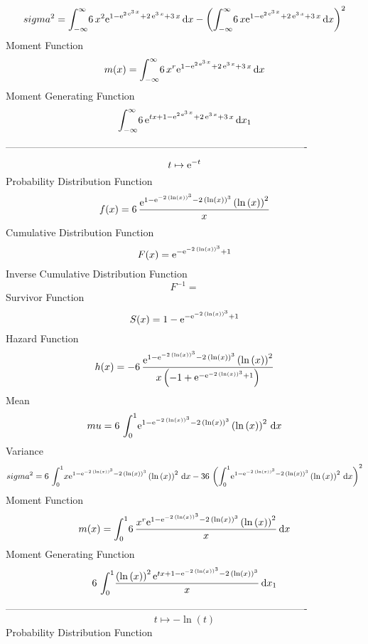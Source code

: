 \documentclass[12pt]{article}
\begin{document}
 $$ sigma^2 = \int_{-\infty }^{\infty }\!6\,{x}^{2}{{\rm e}^{1-{{\rm e}^{2\,{{\rm e}
^{3\,x}}}}+2\,{{\rm e}^{3\,x}}+3\,x}}\,{\rm d}x- \left( \int_{-\infty 
}^{\infty }\!6\,x{{\rm e}^{1-{{\rm e}^{2\,{{\rm e}^{3\,x}}}}+2\,{
{\rm e}^{3\,x}}+3\,x}}\,{\rm d}x \right) ^{2}
$$Moment Function 
 $$ m(x) = \int_{-\infty }^{\infty }\!6\,{x}^{r}{{\rm e}^{1-{{\rm e}^{2\,{{\rm e}
^{3\,x}}}}+2\,{{\rm e}^{3\,x}}+3\,x}}\,{\rm d}x
$$ Moment Generating Function 
 $$\int_{-\infty }^{\infty }\!6\,{{\rm e}^{tx+1-{{\rm e}^{2\,{{\rm e}^{3
\,x}}}}+2\,{{\rm e}^{3\,x}}+3\,x}}\,{\rm d}x_{{1}}
$$-------------------------------------------------------------------------------------------  \\$$t\mapsto {{\rm e}^{-t}}
$$Probability Distribution Function 
$$  f(x)=6\,{\frac {{{\rm e}^{1-{{\rm e}^{-2\, \left( \ln  \left( x \right) 
 \right) ^{3}}}-2\, \left( \ln  \left( x \right)  \right) ^{3}}}
 \left( \ln  \left( x \right)  \right) ^{2}}{x}}
$$Cumulative Distribution Function  
 $$F(x)={{\rm e}^{-{{\rm e}^{-2\, \left( \ln  \left( x \right)  \right) ^{3}}}
+1}}
$$ Inverse Cumulative Distribution Function 
  $$F^{-1} = 
$$Survivor Function 
 $$ S(x)=1-{{\rm e}^{-{{\rm e}^{-2\, \left( \ln  \left( x \right)  \right) ^{3}
}}+1}}
$$ Hazard Function 
 $$ h(x)=-6\,{\frac {{{\rm e}^{1-{{\rm e}^{-2\, \left( \ln  \left( x \right) 
 \right) ^{3}}}-2\, \left( \ln  \left( x \right)  \right) ^{3}}}
 \left( \ln  \left( x \right)  \right) ^{2}}{x \left( -1+{{\rm e}^{-{
{\rm e}^{-2\, \left( \ln  \left( x \right)  \right) ^{3}}}+1}}
 \right) }}
$$Mean 
 $$ mu=6\,\int_{0}^{1}\!{{\rm e}^{1-{{\rm e}^{-2\, \left( \ln  \left( x
 \right)  \right) ^{3}}}-2\, \left( \ln  \left( x \right)  \right) ^{3
}}} \left( \ln  \left( x \right)  \right) ^{2}\,{\rm d}x
$$ Variance 
 $$ sigma^2 = 6\,\int_{0}^{1}\!x{{\rm e}^{1-{{\rm e}^{-2\, \left( \ln  \left( x
 \right)  \right) ^{3}}}-2\, \left( \ln  \left( x \right)  \right) ^{3
}}} \left( \ln  \left( x \right)  \right) ^{2}\,{\rm d}x-36\, \left( 
\int_{0}^{1}\!{{\rm e}^{1-{{\rm e}^{-2\, \left( \ln  \left( x \right) 
 \right) ^{3}}}-2\, \left( \ln  \left( x \right)  \right) ^{3}}}
 \left( \ln  \left( x \right)  \right) ^{2}\,{\rm d}x \right) ^{2}
$$Moment Function 
 $$ m(x) = \int_{0}^{1}\!6\,{\frac {{x}^{r}{{\rm e}^{1-{{\rm e}^{-2\, \left( \ln 
 \left( x \right)  \right) ^{3}}}-2\, \left( \ln  \left( x \right) 
 \right) ^{3}}} \left( \ln  \left( x \right)  \right) ^{2}}{x}}
\,{\rm d}x
$$ Moment Generating Function 
 $$6\,\int_{0}^{1}\!{\frac { \left( \ln  \left( x \right)  \right) ^{2}{
{\rm e}^{tx+1-{{\rm e}^{-2\, \left( \ln  \left( x \right)  \right) ^{3
}}}-2\, \left( \ln  \left( x \right)  \right) ^{3}}}}{x}}\,{\rm d}x_{{
1}}
$$-------------------------------------------------------------------------------------------  \\$$t\mapsto -\ln  \left( t \right) 
$$Probability Distribution Function 
\end{document}
